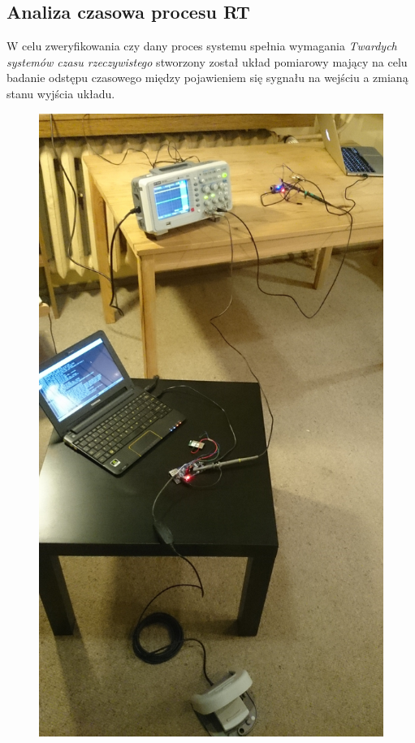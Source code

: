 \subsection{Analiza czasowa procesu RT}

\par
\tab W celu zweryfikowania czy dany proces systemu spełnia wymagania \textit{Twardych systemów czasu rzeczywistego} stworzony został układ pomiarowy mający na celu badanie odstępu czasowego między pojawieniem się sygnału na wejściu a zmianą stanu wyjścia układu. \\ 


\begin{figure}
  \vspace{-20pt}
  \begin{center}
    \includegraphics[scale=0.10]{./img/target_system/response_measure.jpg}
  \end{center}
  \vspace{-10pt}
\end{figure}

